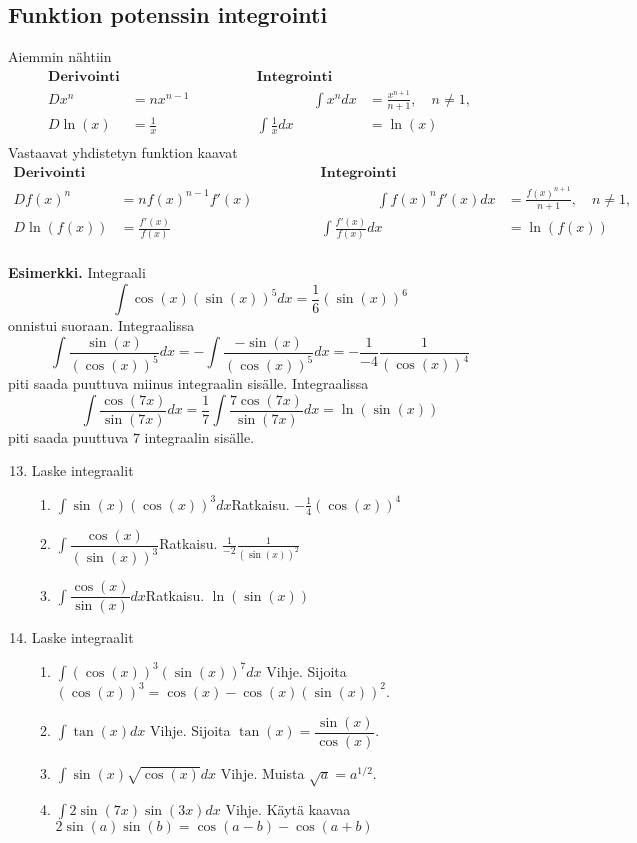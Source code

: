 \documentclass[10pt]{article}
\newcommand{\ratkaisu}[1]{\hfill{\color{blue}\quad\textrm{Ratkaisu. } #1}}
\newcommand{\vihje}[1]{\hfill{\color{red}Vihje. #1}}
\begin{document}
\newpage
\subsection{Funktion potenssin integrointi}

Aiemmin nähtiin
$$
\begin{array}{rl|rl}
\textbf{Derivointi} && \textbf{Integrointi}&\\[2mm]
Dx^n&=nx^{n-1}     \qquad\qquad&\qquad\qquad
\int x^ndx&=\frac{x^{n+1}}{n+1},\quad n\neq 1,\\[2mm]
D\ln(x)&=\frac{1}{x} &
\int\frac{1}{x}dx&=\ln(x)\\[2mm]
\end{array}
$$
Vastaavat yhdistetyn funktion kaavat
$$
\begin{array}{rl|rl}
\textbf{Derivointi} && \textbf{Integrointi}&\\[2mm]
Df(x)^n&=nf(x)^{n-1}f'(x)     \qquad\qquad&\qquad\qquad
\int f(x)^nf'(x)dx&=\frac{f(x)^{n+1}}{n+1},\quad n\neq 1,\\[2mm]
D\ln(f(x))&=\frac{f'(x)}{f(x)} &
\int\frac{f'(x)}{f(x)}dx&=\ln(f(x))\\[2mm]
\end{array}
$$

\textbf{Esimerkki.}
Integraali
$$
\int \cos(x)(\sin(x))^5dx=\frac{1}{6}(\sin(x))^6
$$
onnistui suoraan. Integraalissa
$$
\int \frac{\sin(x)}{(\cos(x))^5}dx=-\int \frac{-\sin(x)}{(\cos(x))^5}dx=-\frac{1}{-4}\frac{1}{(\cos(x))^4}
$$
piti saada puuttuva miinus integraalin sisälle. Integraalissa
$$
\int \frac{\cos(7x)}{\sin(7x)}dx
=
\frac{1}{7}\int \frac{7\cos(7x)}{\sin(7x)}dx=\ln(\sin(x))
$$
piti saada puuttuva $7$ integraalin sisälle.

\begin{enumerate}
\setcounter{enumi}{12}
\item Laske integraalit
\begin{enumerate}
\item $\int \sin(x)(\cos(x))^3dx$\ratkaisu{$-\frac{1}{4}(\cos(x))^4$}
\item $\int\dfrac{\cos(x)}{(\sin(x))^3}$\ratkaisu{$\frac{1}{-2}\frac{1}{(\sin(x))^2}$}
\item $\int\dfrac{\cos(x)}{\sin(x)}dx$\ratkaisu{$\ln(\sin(x))$}
\end{enumerate}
\item Laske integraalit
\begin{enumerate}
\item $\int (\cos(x))^3(\sin(x))^7dx$
\vihje{Sijoita $(\cos(x))^3=\cos(x)-\cos(x)(\sin(x))^2$.}

\item $\int \tan(x)dx$
\vihje{Sijoita $\tan(x)=\dfrac{\sin(x)}{\cos(x)}$.}
\item $\int \sin(x)\sqrt{\cos(x)}dx$
\vihje{Muista $\sqrt{a}=a^{1/2}$.}
\item $\int 2\sin(7x)\sin(3x)dx$
\vihje{Käytä kaavaa $2\sin(a)\sin(b)=\cos(a-b)-\cos(a+b)$}
\end{enumerate}
\end{enumerate}
\end{document}
